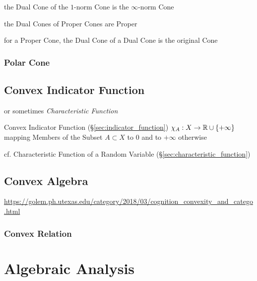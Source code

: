 the Dual Cone of the $1$-norm Cone is the $\infty$-norm Cone

the Dual Cones of Proper Cones are Proper

for a Proper Cone, the Dual Cone of a Dual Cone is the original Cone



\subsubsection{Polar Cone}\label{sec:polar_cone}



\subsection{Convex Indicator Function}\label{sec:convex_indicator_function}

or sometimes \emph{Characteristic Function}

Convex Indicator Function (\S\ref{sec:indicator_function})
$\chi_A : X \rightarrow \mathbb{R} \cup \{ +\infty \}$ mapping Members of the Subset
$A \subset X$ to $0$ and to $+\infty$ otherwise

\fist cf. Characteristic Function of a Random Variable
(\S\ref{sec:characteristic_function})



\subsection{Convex Algebra}\label{sec:convex_algebra}


\url{https://golem.ph.utexas.edu/category/2018/03/cognition_convexity_and_catego.html}



\subsubsection{Convex Relation}\label{sec:convex_relation}



\section{Algebraic Analysis}\label{sec:algebraic_analysis}

